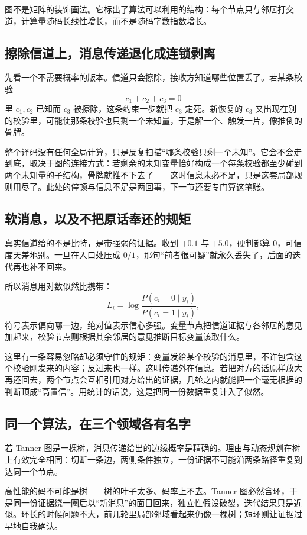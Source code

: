 图不是矩阵的装饰画法。它标出了算法可以利用的结构：每个节点只与邻居打交道，计算量随码长线性增长，而不是随码字数指数增长。

\subsection{擦除信道上，消息传递退化成连锁剥离}

先看一个不需要概率的版本。信道只会擦除，接收方知道哪些位置丢了。若某条校验
\[
c_1+c_2+c_3=0
\]
里 \(c_1,c_2\) 已知而 \(c_3\) 被擦除，这条约束一步就把 \(c_3\) 定死。新恢复的 \(c_3\) 又出现在别的校验里，可能使那条校验也只剩一个未知量，于是解一个、触发一片，像推倒的骨牌。

整个译码没有任何全局计算，只是反复扫描``哪条校验只剩一个未知''。它会不会走到底，取决于图的连接方式：若剩余的未知变量恰好构成一个每条校验都至少碰到两个未知量的子结构，骨牌就推不下去了——这时信息未必不足，只是这套局部规则用尽了。此处的停顿与信息不足是两回事，下一节还要专门算这笔账。

\subsection{软消息，以及不把原话奉还的规矩}

真实信道给的不是比特，是带强弱的证据。收到 \(+0.1\) 与 \(+5.0\)，硬判都算 0，可信度天差地别。一旦在入口处压成 \(0/1\)，那句``前者很可疑''就永久丢失了，后面的迭代再也补不回来。

所以消息用对数似然比携带：
\[
L_i=\log\frac{P(c_i=0\mid y_i)}{P(c_i=1\mid y_i)},
\]
符号表示偏向哪一边，绝对值表示信心多强。变量节点把信道证据与各邻居的意见加起来，校验节点则根据其余邻居的意见推断目标变量该取什么。

这里有一条容易忽略却必须守住的规矩：变量发给某个校验的消息里，不许包含这个校验刚发来的内容；反过来也一样。这叫传递外在信息。若把对方的话原样放大再还回去，两个节点会互相引用对方给出的证据，几轮之内就能把一个毫无根据的判断顶成``高置信''。用统计的话说，这是把同一份数据重复计入了似然。

\subsection{同一个算法，在三个领域各有名字}

若 Tanner 图是一棵树，消息传递给出的边缘概率是精确的。理由与动态规划在树上有效完全相同：切断一条边，两侧条件独立，一份证据不可能沿两条路径重复到达同一个节点。

高性能的码不可能是树——树的叶子太多、码率上不去。Tanner 图必然含环，于是同一份证据绕一圈后以``新消息''的面目回来，独立性假设破裂，迭代结果只是近似。环长的时候问题不大，前几轮里局部邻域看起来仍像一棵树；短环则让证据过早地自我确认。

